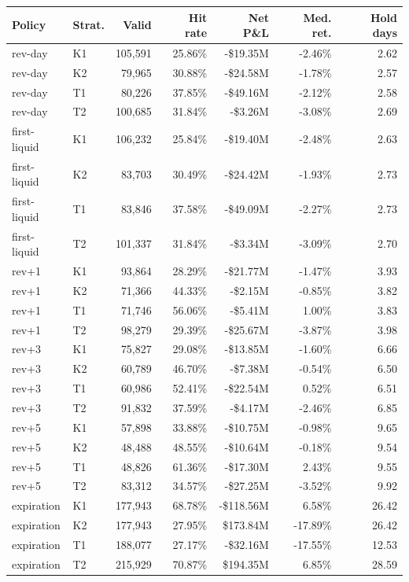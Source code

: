 \documentclass[11pt]{article}
\begin{document}
\begin{center}
\footnotesize
\begin{tabular}{llrrrrr}
\toprule
Policy & Strat. & Valid & Hit rate & Net P\&L & Med. ret. & Hold days \\
\midrule
rev-day & K1 & 105,591 & 25.86\% & -\$19.35M & -2.46\% & 2.62 \\
rev-day & K2 & 79,965 & 30.88\% & -\$24.58M & -1.78\% & 2.57 \\
rev-day & T1 & 80,226 & 37.85\% & -\$49.16M & -2.12\% & 2.58 \\
rev-day & T2 & 100,685 & 31.84\% & -\$3.26M & -3.08\% & 2.69 \\
first-liquid & K1 & 106,232 & 25.84\% & -\$19.40M & -2.48\% & 2.63 \\
first-liquid & K2 & 83,703 & 30.49\% & -\$24.42M & -1.93\% & 2.73 \\
first-liquid & T1 & 83,846 & 37.58\% & -\$49.09M & -2.27\% & 2.73 \\
first-liquid & T2 & 101,337 & 31.84\% & -\$3.34M & -3.09\% & 2.70 \\
rev+1 & K1 & 93,864 & 28.29\% & -\$21.77M & -1.47\% & 3.93 \\
rev+1 & K2 & 71,366 & 44.33\% & -\$2.15M & -0.85\% & 3.82 \\
rev+1 & T1 & 71,746 & 56.06\% & -\$5.41M & 1.00\% & 3.83 \\
rev+1 & T2 & 98,279 & 29.39\% & -\$25.67M & -3.87\% & 3.98 \\
rev+3 & K1 & 75,827 & 29.08\% & -\$13.85M & -1.60\% & 6.66 \\
rev+3 & K2 & 60,789 & 46.70\% & -\$7.38M & -0.54\% & 6.50 \\
rev+3 & T1 & 60,986 & 52.41\% & -\$22.54M & 0.52\% & 6.51 \\
rev+3 & T2 & 91,832 & 37.59\% & -\$4.17M & -2.46\% & 6.85 \\
rev+5 & K1 & 57,898 & 33.88\% & -\$10.75M & -0.98\% & 9.65 \\
rev+5 & K2 & 48,488 & 48.55\% & -\$10.64M & -0.18\% & 9.54 \\
rev+5 & T1 & 48,826 & 61.36\% & -\$17.30M & 2.43\% & 9.55 \\
rev+5 & T2 & 83,312 & 34.57\% & -\$27.25M & -3.52\% & 9.92 \\
expiration & K1 & 177,943 & 68.78\% & -\$118.56M & 6.58\% & 26.42 \\
expiration & K2 & 177,943 & 27.95\% & \$173.84M & -17.89\% & 26.42 \\
expiration & T1 & 188,077 & 27.17\% & -\$32.16M & -17.55\% & 12.53 \\
expiration & T2 & 215,929 & 70.87\% & \$194.35M & 6.85\% & 28.59 \\
\bottomrule
\end{tabular}
\normalsize
\end{center}
\end{document}
